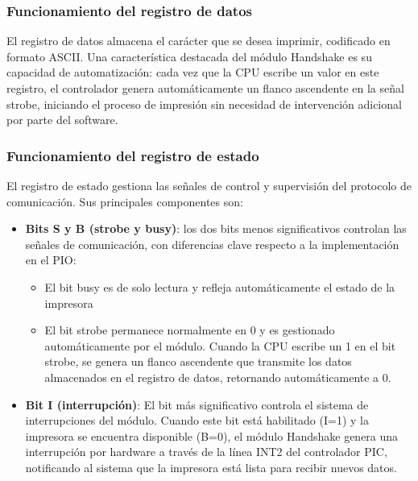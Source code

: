 \documentclass[12pt,oneside]{templates/unerthesis}
\providecommand{\tightlist}{%
  \setlength{\itemsep}{0pt}\setlength{\parskip}{0pt}}
\begin{document}
\hypertarget{funcionamiento-del-registro-de-datos}{%
\subsubsection{Funcionamiento del registro de datos}\label{funcionamiento-del-registro-de-datos}}

El registro de datos almacena el carácter que se desea imprimir, codificado en formato ASCII. Una característica destacada del módulo Handshake es su capacidad de automatización: cada vez que la CPU escribe un valor en este registro, el controlador genera automáticamente un flanco ascendente en la señal strobe, iniciando el proceso de impresión sin necesidad de intervención adicional por parte del software.

\hypertarget{funcionamiento-del-registro-de-estado}{%
\subsubsection{Funcionamiento del registro de estado}\label{funcionamiento-del-registro-de-estado}}

El registro de estado gestiona las señales de control y supervisión del protocolo de comunicación. Sus principales componentes son:

\begin{itemize}
\tightlist
\item
  \textbf{Bits S y B (strobe y busy)}: los dos bits menos significativos controlan las señales de comunicación, con diferencias clave respecto a la implementación en el PIO:

  \begin{itemize}
  \tightlist
  \item
    El bit busy es de solo lectura y refleja automáticamente el estado de la impresora
  \item
    El bit strobe permanece normalmente en 0 y es gestionado automáticamente por el módulo. Cuando la CPU escribe un 1 en el bit strobe, se genera un flanco ascendente que transmite los datos almacenados en el registro de datos, retornando automáticamente a 0.
  \end{itemize}
\item
  \textbf{Bit I (interrupción)}: El bit más significativo controla el sistema de interrupciones del módulo. Cuando este bit está habilitado (I=1) y la impresora se encuentra disponible (B=0), el módulo Handshake genera una interrupción por hardware a través de la línea INT2 del controlador PIC, notificando al sistema que la impresora está lista para recibir nuevos datos.
\end{itemize}
\end{document}
